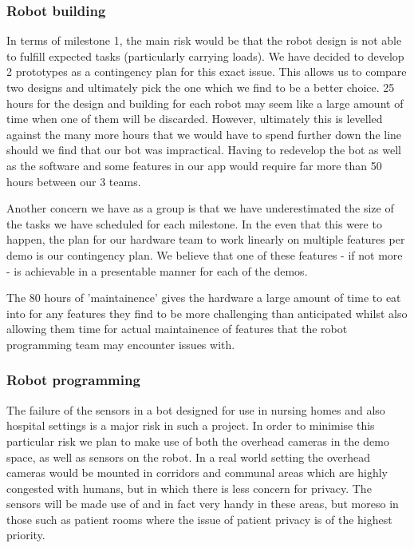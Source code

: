 \documentclass{article}
\begin{document}
\subsubsection{Robot building}

In terms of milestone 1, the main risk would be that the robot design is not able to fulfill expected tasks (particularly carrying loads). We have decided to develop 2 prototypes as a contingency plan for this exact issue. This allows us to compare two designs and ultimately pick the one which we find to be a better choice. 25 hours for the design and building for each robot may seem like a large amount of time when one of them will be discarded. However, ultimately this is levelled against the many more hours that we would have to spend further down the line should we find that our bot was impractical. Having to redevelop the bot as well as the software and some features in our app would require far more than 50 hours between our 3 teams.

Another concern we have as a group is that we have underestimated the size of the tasks we have scheduled for each milestone. In the even that this were to happen, the plan for our hardware team to work linearly on multiple features per demo is our contingency plan. We believe that one of these features - if not more - is achievable in a presentable manner for each of the demos.

The 80 hours of 'maintainence' gives the hardware a large amount of time to eat into for any features they find to be more challenging than anticipated whilst also allowing them time for actual maintainence of features that the robot programming team may encounter issues with.

\subsubsection{Robot programming}

The failure of the sensors in a bot designed for use in nursing homes and also hospital settings is a major risk in such a project. In order to minimise this particular risk we plan to make use of both the overhead cameras in the demo space, as well as sensors on the robot. In a real world setting the overhead cameras would be mounted in corridors and communal areas which are highly congested with humans, but in which there is less concern for privacy. The sensors will be made use of and in fact very handy in these areas, but moreso in those such as patient rooms where the issue of patient privacy is of the highest priority.
\end{document}
